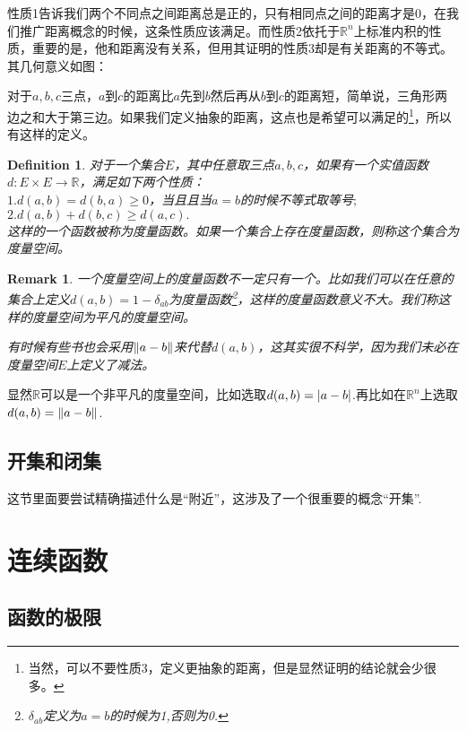 \documentclass[11pt,a4paper,openany]{book}%
\theoremstyle{plain}%
\newtheorem*{rem}{Remark}%
\newtheorem{defi}{Definition}[chapter]%
\begin{document}
性质1告诉我们两个不同点之间距离总是正的，只有相同点之间的距离才是0，在我们推广距离概念的时候，这条性质应该满足。而性质2依托于$\mathbb{R}^n$上标准内积的性质，重要的是，他和距离没有关系，但用其证明的性质3却是有关距离的不等式。其几何意义如图：
\begin{center}
\end{center}
对于$a,b,c$三点，$a$到$c$的距离比$a$先到$b$然后再从$b$到$c$的距离短，简单说，三角形两边之和大于第三边。如果我们定义抽象的距离，这点也是希望可以满足的\footnote{当然，可以不要性质3，定义更抽象的距离，但是显然证明的结论就会少很多。}，所以有这样的定义。
\begin{defi}
对于一个集合$E$，其中任意取三点$a,b,c$，如果有一个实值函数$d:E\times E\rightarrow \mathbb{R}$，满足如下两个性质：\\
$1.d(a,b)=d(b,a)\geq 0 $，当且且当$a=b$的时候不等式取等号$;$\\
$2.d(a,b)+d(b,c)\geq d(a,c).$\\
这样的一个函数被称为度量函数。如果一个集合上存在度量函数，则称这个集合为度量空间。
\end{defi}
\begin{rem}
一个度量空间上的度量函数不一定只有一个。比如我们可以在任意的集合上定义$d(a,b)=1-\delta_{ab}$为度量函数\footnote{$\delta_{ab}$定义为$a=b$的时候为1,否则为0.}，这样的度量函数意义不大。我们称这样的度量空间为平凡的度量空间。

有时候有些书也会采用$\Arrowvert a-b \Arrowvert$来代替$d(a,b)$，这其实很不科学，因为我们未必在度量空间$E$上定义了减法。
\end{rem}
显然$\mathbb{R}$可以是一个非平凡的度量空间，比如选取$d(a,b)=\arrowvert a-b\arrowvert$.再比如在$\mathbb{R}^n$上选取$d(a,b)=\Arrowvert a-b \Arrowvert$.
\subsection{开集和闭集}
这节里面要尝试精确描述什么是“附近”，这涉及了一个很重要的概念“开集”.
\clearpage
\section{连续函数}
\subsection{函数的极限}
\end{document}
